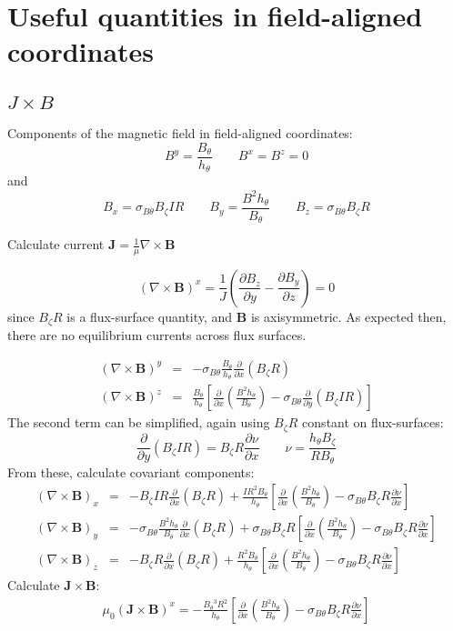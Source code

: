 \documentclass[12pt]{article}
\newcommand{\sbt}{\ensuremath{\sigma_{B\theta}}}
\newcommand{\deriv}[2]{\ensuremath{\frac{\partial #1}{\partial #2}}}
\newcommand{\hthe}{\ensuremath{h_\theta}}
\newcommand{\Bp}{\ensuremath{B_\theta}}
\newcommand{\Bt}{\ensuremath{B_\zeta}}
\newcommand{\Vec}[1]{\ensuremath{\mathbf{#1}}}
\newcommand{\Bvec}{\Vec{B}}
\newcommand{\Jvec}{\Vec{J}}
\newcommand{\Curl}[1]{\ensuremath{\nabla\times #1 }}
\begin{document}
\section{Useful quantities in field-aligned coordinates}
\subsection{$J\times B$}

Components of the magnetic field in field-aligned coordinates:
\[
B^y = \frac{\Bp}{\hthe} \qquad B^x = B^z = 0
\]
and
\[
B_x = \sbt \Bt I R \qquad B_y = \frac{B^2\hthe}{\Bp} \qquad B_z = \sbt \Bt R
\]

Calculate current $\Jvec = \frac{1}{\mu}\Curl{\Bvec}$

\[
\left(\Curl{\Bvec}\right)^x = \frac{1}{J}\left(\deriv{B_z}{y} - \deriv{B_y}{z}\right) = 0
\]
since $\Bt R$ is a flux-surface quantity, and $\Bvec$ is axisymmetric. As expected then,
there are no equilibrium currents across flux surfaces.

\begin{eqnarray*}
\left(\Curl{\Bvec}\right)^y &=& -\sbt\frac{\Bp}{\hthe}\deriv{}{x}\left(\Bt R\right) \\
\left(\Curl{\Bvec}\right)^z &=& \frac{\Bp}{\hthe}\left[\deriv{}{x}\left(\frac{B^2\hthe}{\Bp}\right) - \sbt\deriv{}{y}\left(\Bt I R\right)\right]
\end{eqnarray*}
The second term can be simplified, again using $\Bt R$ constant on flux-surfaces:
\[
\deriv{}{y}\left(\Bt I R\right) = \Bt R\deriv{\nu}{x} \qquad \nu = \frac{\hthe\Bt}{R\Bp}
\]
From these, calculate covariant components:
\begin{eqnarray}
\left(\Curl{\Bvec}\right)_x &=& -\Bt I R \deriv{}{x}\left(\Bt R\right) + \frac{IR^2\Bp}{\hthe}\left[\deriv{}{x}\left(\frac{B^2\hthe}{\Bp}\right) - \sbt\Bt R\deriv{\nu}{x}\right] \nonumber\\
\left(\Curl{\Bvec}\right)_y &=& -\sbt\frac{B^2\hthe}{\Bp}\deriv{}{x}\left(\Bt R\right) + \sbt\Bt R\left[\deriv{}{x}\left(\frac{B^2\hthe}{\Bp}\right) - \sbt\Bt R\deriv{\nu}{x}\right] \label{eq:curlb_y}\\
\left(\Curl{\Bvec}\right)_z &=& -\Bt R\deriv{}{x}\left(\Bt R\right) + \frac{R^2\Bp}{\hthe}\left[\deriv{}{x}\left(\frac{B^2\hthe}{\Bp}\right) - \sbt\Bt R\deriv{\nu}{x}\right] \nonumber
\end{eqnarray}
Calculate $\Jvec\times\Bvec$:
\begin{eqnarray*}
\mu_0 \left(\Jvec\times\Bvec\right)^x = -\frac{\Bp^3 R^2}{\hthe}\left[\deriv{}{x}\left(\frac{B^2\hthe}{\Bp}\right) - \sbt\Bt R\deriv{\nu}{x}\right]
\end{eqnarray*}
\end{document}
